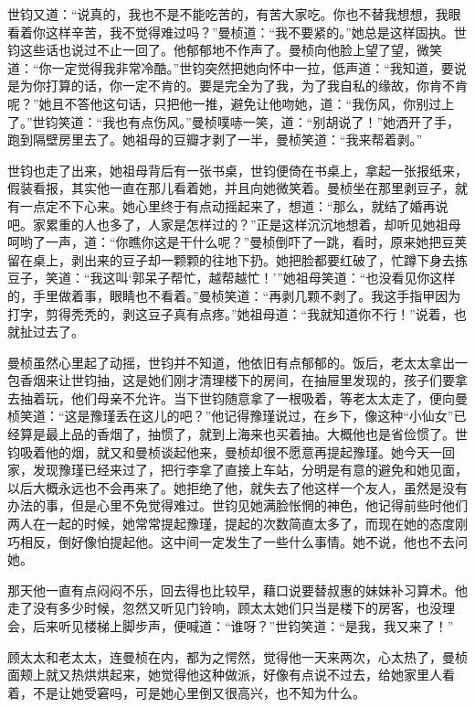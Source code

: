 \par 世钧又道：“说真的，我也不是不能吃苦的，有苦大家吃。你也不替我想想，我眼看着你这样辛苦，我不觉得难过吗？”曼桢道：“我不要紧的。”她总是这样固执。世钧这些话也说过不止一回了。他郁郁地不作声了。曼桢向他脸上望了望，微笑道：“你一定觉得我非常冷酷。”世钧突然把她向怀中一拉，低声道：“我知道，要说是为你打算的话，你一定不肯的。要是完全为了我，为了我自私的缘故，你肯不肯呢？”她且不答他这句话，只把他一推，避免让他吻她，道：“我伤风，你别过上了。”世钧笑道：“我也有点伤风。”曼桢噗哧一笑，道：“别胡说了！”她洒开了手，跑到隔壁房里去了。她祖母的豆瓣才剥了一半，曼桢笑道：“我来帮着剥。”
\par 世钧也走了出来，她祖母背后有一张书桌，世钧便倚在书桌上，拿起一张报纸来，假装看报，其实他一直在那儿看着她，并且向她微笑着。曼桢坐在那里剥豆子，就有一点定不下心来。她心里终于有点动摇起来了，想道：“那么，就结了婚再说吧。家累重的人也多了，人家是怎样过的？”正是这样沉沉地想着，却听见她祖母呵哟了一声，道：“你瞧你这是干什么呢？”曼桢倒吓了一跳，看时，原来她把豆荚留在桌上，剥出来的豆子却一颗颗的往地下扔。她把脸都要红破了，忙蹲下身去拣豆子，笑道：“我这叫‘郭呆子帮忙，越帮越忙！’”她祖母笑道：“也没看见你这样的，手里做着事，眼睛也不看着。”曼桢笑道：“再剥几颗不剥了。我这手指甲因为打字，剪得秃秃的，剥这豆子真有点疼。”她祖母道：“我就知道你不行！”说着，也就扯过去了。
\par 曼桢虽然心里起了动摇，世钧并不知道，他依旧有点郁郁的。饭后，老太太拿出一包香烟来让世钧抽，这是她们刚才清理楼下的房间，在抽屉里发现的，孩子们要拿去抽着玩，他们母亲不允许。当下世钧随意拿了一根吸着，等老太太走了，便向曼桢笑道：“这是豫瑾丢在这儿的吧？”他记得豫瑾说过，在乡下，像这种“小仙女”已经算是最上品的香烟了，抽惯了，就到上海来也买着抽。大概他也是省俭惯了。世钧吸着他的烟，就又和曼桢谈起他来，曼桢却很不愿意再提起豫瑾。她今天一回家，发现豫瑾已经来过了，把行李拿了直接上车站，分明是有意的避免和她见面，以后大概永远也不会再来了。她拒绝了他，就失去了他这样一个友人，虽然是没有办法的事，但是心里不免觉得难过。世钧见她满脸怅惘的神色，他记得前些时他们两人在一起的时候，她常常提起豫瑾，提起的次数简直太多了，而现在她的态度刚巧相反，倒好像怕提起他。这中间一定发生了一些什么事情。她不说，他也不去问她。
\par 那天他一直有点闷闷不乐，回去得也比较早，藉口说要替叔惠的妹妹补习算术。他走了没有多少时候，忽然又听见门铃响，顾太太她们只当是楼下的房客，也没理会，后来听见楼梯上脚步声，便喊道：“谁呀？”世钧笑道：“是我，我又来了！”
\par 顾太太和老太太，连曼桢在内，都为之愕然，觉得他一天来两次，心太热了，曼桢面颊上就又热烘烘起来，她觉得他这种做派，好像有点说不过去，给她家里人看着，不是让她受窘吗，可是她心里倒又很高兴，也不知为什么。
